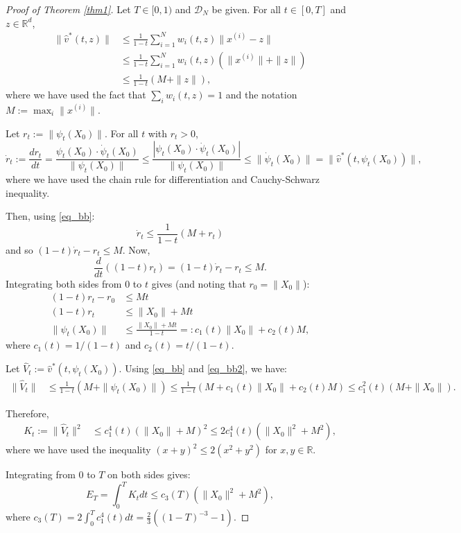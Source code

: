 \documentclass[a4paper,11pt]{article}
\newcommand{\R}{\mathbb{R}}
\theoremstyle{plain}
\theoremstyle{definition}
\begin{document}
\begin{proof}[Proof of Theorem \ref{thm1}]
Let $T \in [0,1)$ and $\mathcal{D}_N$ be given. For all $t \in [0,T]$ and $z \in \R^d$, 
\begin{align}
    \|\hat{v}^*(t,z)\| &\leq \frac{1}{1-t} \sum_{i=1}^N w_i(t,z) \|x^{(i)} - z\| \\
    &\leq \frac{1}{1-t} \sum_{i=1}^N w_i(t,z) (\|x^{(i)}\| + \|z\|) \\
    &\leq \frac{1}{1-t}(M + \|z\|), \label{eq_bb}
\end{align}
where we have used the fact that $\sum_i w_i(t,z) = 1$ and the notation $M := \max_i \|x^{(i)}\|$.

Let $r_t := \|\psi_t(X_0)\|$. For all $t$ with $r_t > 0$, 
$$\dot{r}_t := \frac{dr_t}{dt} = \frac{\psi_t(X_0) \cdot \dot{\psi}_t(X_0)}{\|\psi_t(X_0)\|} \leq \frac{|\psi_t(X_0) \cdot \dot{\psi}_t(X_0)|}{\|\psi_t(X_0)\|} \leq \|\dot{\psi}_t(X_0)\| = \|\hat{v}^*(t, \psi_t(X_0))\|, $$
where we have used the chain rule for differentiation and Cauchy-Schwarz inequality.

Then, using \eqref{eq_bb}:
$$\dot{r}_t \leq \frac{1}{1-t} (M + r_t) $$
and so $(1-t) \dot{r}_t - r_t \leq M$.
Now, $$\frac{d}{dt}\left((1-t) r_t \right) = (1-t) \dot{r}_t - r_t \leq M.$$
Integrating both sides from $0$ to $t$ gives (and noting that $r_0 = \|X_0\|$): 
\begin{align} 
    (1-t) r_t - r_0 &\leq M t \\
    (1-t) r_t &\leq \|X_0\| + Mt \\
    \|\psi_t(X_0)\| &\leq \frac{\|X_0\| + Mt}{1-t} =: c_1(t) \|X_0\| + c_2(t) M, \label{eq_bb2}
\end{align}
where $c_1(t) = 1/(1-t)$ and $c_2(t) = t/(1-t)$.

Let $\hat{V}_t := \hat{v}^*(t, \psi_t(X_0))$. Using \eqref{eq_bb} and \eqref{eq_bb2}, we have:
\begin{align}
    \|\hat{V}_t\| &\leq \frac{1}{1-t}(M + \|\psi_t(X_0)\|) \leq \frac{1}{1-t}(M + c_1(t) \|X_0\| + c_2(t) M) \leq c_1^2(t) (M + \|X_0\|).
\end{align}

Therefore, 
\begin{align}
    K_t := \|\hat{V}_t\|^2 &\leq c_1^4(t) (\|X_0\| + M)^2 \leq 2 c_1^4(t) (\|X_0\|^2 + M^2),
\end{align}
where we have used the inequality $(x+y)^2 \leq 2(x^2 + y^2)$ for $x, y \in \R$. 

Integrating from $0$ to $T$ on both sides gives:
$$E_T = \int_0^T K_t dt \leq c_3(T) (\|X_0\|^2 + M^2), $$ where $c_3(T) =2  \int_0^T c_1^4(t) dt = \frac{2}{3}((1-T)^{-3} - 1)$.


\end{proof}
\end{document}
